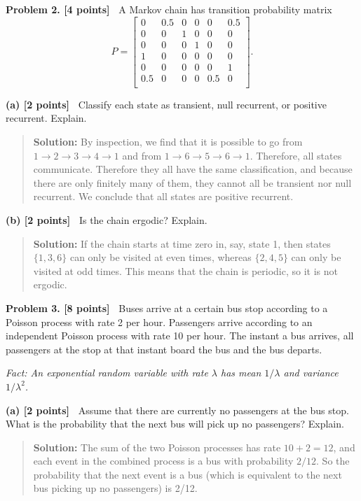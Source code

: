 \documentclass{article}
\newcommand{\svskip}{\vspace{.2in}}
\newcommand{\mvskip}{\vspace{.25in}}
\begin{document}
\mvskip 
{\bf Problem 2.  [4 points]\ } 
A Markov chain has transition probability matrix
\[
P=
\begin{bmatrix}
0 & 0.5 & 0 & 0 & 0 & 0.5 \\
0 & 0 & 1 & 0 & 0 & 0 \\
0 & 0 & 0 & 1 & 0 & 0 \\
1 & 0 & 0 & 0 & 0 & 0 \\
0 & 0 & 0 & 0 & 0 & 1 \\
0.5 & 0 & 0 & 0 & 0.5 & 0 \\
\end{bmatrix}.
\]

\svskip 
{\bf(a) [2 points]\ }  
Classify each state as transient, null recurrent, or positive recurrent.  Explain.
  \begin{quotation}{\bf Solution:}
  By inspection, we find that it is possible to go from 
  $1\to2\to3\to4\to1$ and from $1\to6\to5\to6\to1$.  Therefore, all states communicate.
  Therefore they all have the same classification, and because there are only finitely
  many of them, they cannot all be transient nor null recurrent.  We conclude that
  all states are positive recurrent.
  \end{quotation}

\svskip 
{\bf(b) [2 points]\ }  
Is the chain ergodic?  Explain.
  \begin{quotation}{\bf Solution:}
  If the chain starts at time zero in, say, state 1, then states $\{1, 3, 6\}$ can only be 
  visited at even times, whereas $\{2, 4, 5\}$ can only be visited at odd times.
  This means that the chain is periodic, so it is not ergodic.
  \end{quotation}

\mvskip
{\bf Problem 3.  [8 points]\ } 
Buses arrive at a certain bus stop according to a Poisson process with rate
2 per hour.  
Passengers arrive according to an independent Poisson process with rate
10 per hour.  The instant a bus arrives, all passengers at the stop at that instant board the
bus and the bus departs.  

\svskip
{\em Fact:  An exponential random variable with rate $\lambda$ has
mean $1/\lambda$ and variance $1/\lambda^2$.}

\mvskip
{\bf(a) [2 points]\ }  
Assume that there are currently no passengers at the bus stop.
What is the probability that the next bus will pick up no passengers?  Explain.
  \begin{quotation}{\bf Solution:}
  The sum of the two Poisson processes has rate $10+2=12$, and each event in 
  the combined process is a bus with probability $2/12$.  So the probability
  that the next event is a bus (which is equivalent to the next bus picking up no passengers)
  is 2/12.
  \end{quotation}
\end{document}
